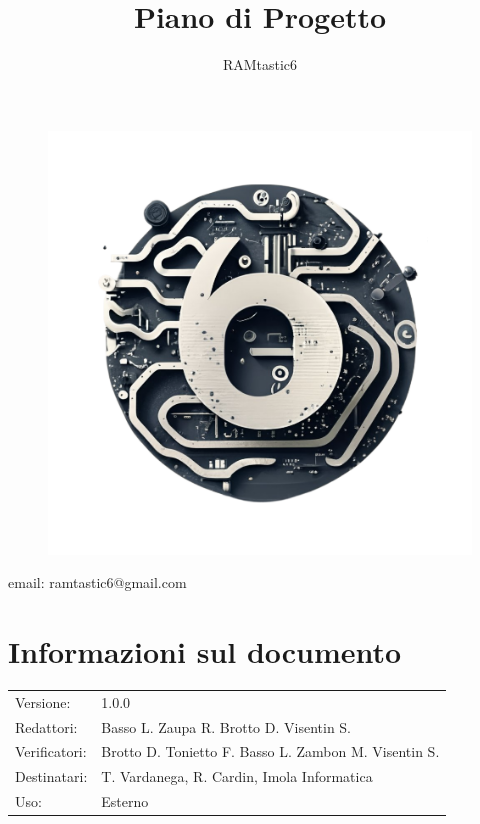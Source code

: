 \documentclass[12pt, oneside]{article}
\author{RAMtastic6}
\begin{document}
\thispagestyle{empty}
\title{Piano di Progetto}
\maketitle
\begin{figure}[h]
  \centering
  \includegraphics[scale=0.3]{logo.png}
\end{figure}
\begin{center}
    email: ramtastic6@gmail.com
\end{center}

\section*{Informazioni sul documento}
\begin{tabular}{ll}
Versione: & 1.0.0 \\
Redattori: & Basso L. Zaupa R. Brotto D. Visentin S.\\
Verificatori: & Brotto D. Tonietto F. Basso L. Zambon M. Visentin S. \\ 
Destinatari: & T. Vardanega, R. Cardin, Imola Informatica \\
Uso: & Esterno
\end{tabular}
\newpage

\end{document}
